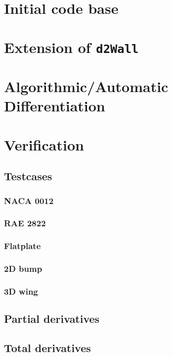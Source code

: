 \section{Initial code base}

\section{Extension of \texttt{d2Wall}}

\section{Algorithmic/Automatic Differentiation}

\section{Verification}

\subsection{Testcases}

\subsubsection{NACA 0012}
\subsubsection{RAE 2822}
\subsubsection{Flatplate}
\subsubsection{2D bump}
\subsubsection{3D wing}


\subsection{Partial derivatives}

\subsection{Total derivatives}


